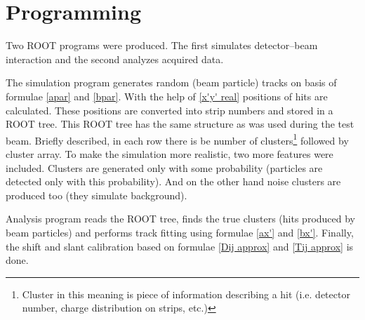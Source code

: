 \section{Programming}
Two ROOT programs were produced. The first simulates detector--beam interaction and the second analyzes acquired data.

The simulation program generates random (beam particle) tracks on basis of formulae \ref{apar} and \ref{bpar}. With the help of \equ{} \ref{x'y' real} positions of hits are calculated. These positions are converted into strip numbers and stored in a ROOT tree. This ROOT tree has the same structure as was used during the test beam. Briefly described, in each row there is be number of clusters\footnote{
Cluster in this meaning is piece of information describing a hit (i.e. detector number,
charge distribution on strips, etc.)
} followed by cluster array. To make the simulation more realistic, two more features were included. Clusters are generated only with some probability (particles are detected only with this probability). And on the other hand noise clusters are produced too (they simulate background).

Analysis program reads the ROOT tree, finds the true clusters (hits produced by beam particles) and
performs track fitting using formulae \ref{ax'} and \ref{bx'}. Finally, the shift and slant calibration based on formulae \ref{Dij approx} and \ref{Tij approx} is done.

{}
